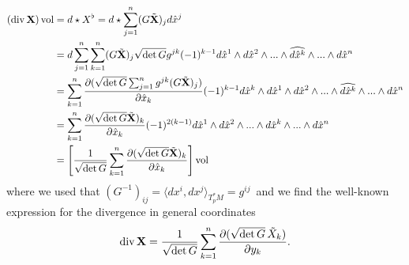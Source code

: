 \documentclass[../master_thesis.tex]{subfiles}
\begin{document}
\begin{align*}
    (\operatorname{div} \mathbf{X}) \operatorname{vol} 
    &= d \star X^\flat 
    = d \star \sum_{j=1}^n (G \tilde{\mathbf{X}})_j d\hat{x}^j 
    \\ &= d \sum_{j=1}^n \sum_{k=1}^n (G \tilde{\mathbf{X}})_j 
        \sqrt{ \det G} g^{jk} (-1)^{k-1} d\hat{x}^1 \wedge d\hat{x}^2 \wedge ... \wedge 
        \widehat{d\hat{x}^k} \wedge ... \wedge d\hat{x}^n 
    \\ &= \sum_{k=1}^n \frac{\partial
        (\sqrt{ \det G} \sum_{j=1}^n g^{jk} (G \tilde{\mathbf{X}})_j )}
        {\partial \hat{x}_k} (-1)^{k-1} d\hat{x}^k \wedge d\hat{x}^1 \wedge d\hat{x}^2 \wedge ... \wedge 
        \widehat{d\hat{x}^k} \wedge ... \wedge d\hat{x}^n 
    \\ &= \sum_{k=1}^n \frac{\partial (\sqrt{ \det G}  \tilde{\mathbf{X}})_k }
        {\partial \hat{x}_k} (-1)^{2(k-1)} d\hat{x}^1 \wedge d\hat{x}^2 \wedge ... \wedge 
        d\hat{x}^k \wedge ... \wedge d\hat{x}^n
    \\ &= \left[ \frac{1}{\sqrt{ \det G}} \sum_{k=1}^n 
        \frac{\partial (\sqrt{ \det G}  \tilde{\mathbf{X}})_k }{\partial \hat{x}_k}
        \right] \operatorname{vol}
\end{align*}
where we used that $(G^{-1})_{ij} = \langle dx^i, dx^j \rangle_{T^*_p M} = g^{ij}$\
and we find the well-known expression for the divergence in general coordinates
\begin{align*}
    \operatorname{div} \mathbf{X} = \frac{1}{\sqrt{ \det G}} \sum_{k=1}^n 
        \frac{\partial (\sqrt{ \det G} \, \tilde{X}_k )}{\partial y_k}.
\end{align*}
\end{document}
